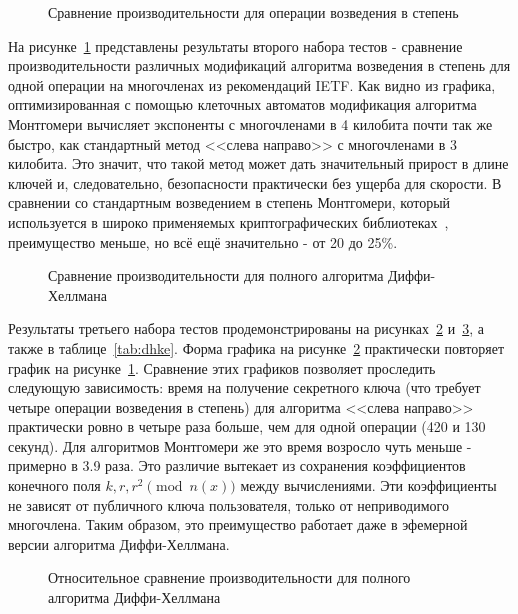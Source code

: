 \documentclass[times,specification,annotation]{itmo-student-thesis}
\begin{document}
\begin{figure}[!h]
\caption{Сравнение производительности для операции возведения в степень}\label{fig:res_bignum}

\end{figure}

На рисунке~\ref{fig:res_bignum} представлены результаты второго набора тестов - сравнение производительности различных
модификаций алгоритма возведения в степень для одной операции на многочленах из рекомендаций IETF.
Как видно из графика, оптимизированная с помощью клеточных автоматов модификация алгоритма Монтгомери
вычисляет экспоненты с многочленами в 4 килобита почти так же быстро, как стандартный метод <<слева направо>> с
многочленами в 3 килобита.
Это значит, что такой метод может дать значительный прирост в длине ключей и, следовательно, безопасности практически
без ущерба для скорости.
В сравнении со стандартным возведением в степень Монтгомери, который используется в широко применяемых
криптографических библиотеках~\cite{openssl}, преимущество меньше, но всё ещё значительно - от 20 до 25\%.

\begin{figure}[!h]
\caption{Сравнение производительности для полного алгоритма Диффи-Хеллмана}\label{fig:res_dhke}

\end{figure}

Результаты третьего набора тестов продемонстрированы на рисунках~\ref{fig:res_dhke} и~\ref{fig:res_dhke_per},
а также в таблице~\ref{tab:dhke}.
Форма графика на рисунке~\ref{fig:res_dhke} практически повторяет график на рисунке~\ref{fig:res_bignum}.
Сравнение этих графиков позволяет проследить следующую зависимость: время на получение секретного ключа (что
требует четыре операции возведения в степень) для алгоритма <<слева направо>> практически ровно в четыре раза
больше, чем для одной операции (420 и 130 секунд).
Для алгоритмов Монтгомери же это время возросло чуть меньше - примерно в 3.9 раза.
Это различие вытекает из сохранения коэффициентов конечного поля $k, r, r^2 \pmod{n(x)}$ между вычислениями.
Эти коэффициенты не зависят от публичного ключа пользователя, только от неприводимого многочлена.
Таким образом, это преимущество работает даже в эфемерной версии алгоритма Диффи-Хеллмана.


\begin{figure}[!h]
\caption{Относительное сравнение производительности для полного алгоритма Диффи-Хеллмана}\label{fig:res_dhke_per}

\end{figure}
\end{document}
